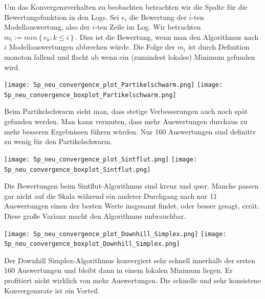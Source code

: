 \documentclass[a4paper,12pt]{article}
\begin{document}
Um das Konvergenzverhalten zu beobachten betrachten wir die Spalte für die Bewertungsfunktion in den Logs. Sei $e_i$ die Bewertung der $i$-ten Modellauswertung, also der $i$-ten Zeile im Log. Wir betrachten $m_i := min\left\{e_k:k\leq i\right\}$. Dies ist die Bewertung, wenn man den Algorithmus nach $i$ Modellauswertungen abbrechen würde. Die Folge der $m_i$ ist durch Definition monoton fallend und flacht ab wenn ein (zumindest lokales) Minimum gefunden wird. 

\texttt{[image: 5p\_neu\_convergence\_plot\_Partikelschwarm.png]}
\texttt{[image: 5p\_neu\_convergence\_boxplot\_Partikelschwarm.png]}

Beim Partikelschwarm sieht man, dass stetige Verbesserungen auch noch spät gefunden werden. Man kann vermuten, dass mehr Auswertungen durchaus zu mehr besseren Ergebnissen führen würden. Nur 160 Auswertungen sind definitiv zu wenig für den Partikelschwarm. 

\texttt{[image: 5p\_neu\_convergence\_plot\_Sintflut.png]}
\texttt{[image: 5p\_neu\_convergence\_boxplot\_Sintflut.png]}

Die Bewertungen beim Sintflut-Algorithmus sind kreuz und quer. Manche passen gar nicht auf die Skala während ein anderer Durchgang nach nur 11 Auswertungen einen der besten Werte insgesamt findet, oder besser gesagt, errät. Diese große Varianz macht den Algorithmus unbrauchbar.

\texttt{[image: 5p\_neu\_convergence\_plot\_Downhill\_Simplex.png]}
\texttt{[image: 5p\_neu\_convergence\_boxplot\_Downhill\_Simplex.png]}

Der Downhill Simplex-Algorithmus konvergiert sehr schnell innerhalb der ersten 160 Auswertungen und bleibt dann in einem lokalen Minimum liegen. Er profitiert nicht wirklich von mehr Auswertungen. Die schnelle und sehr konsistene Konvergenzrate ist ein Vorteil.
\end{document}
